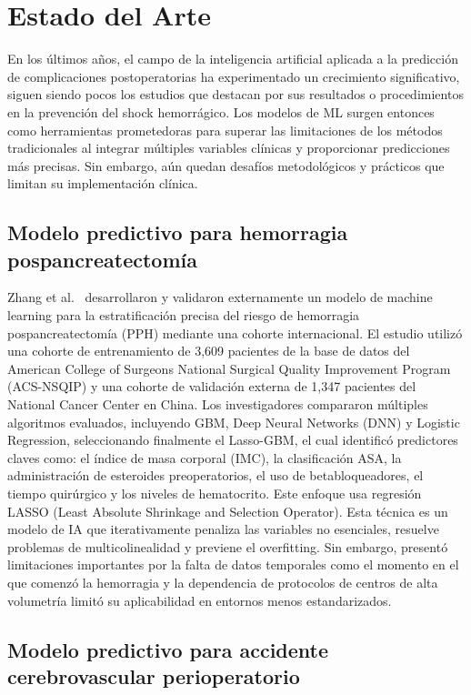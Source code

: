 \section{Estado del Arte}

En los últimos años, el campo de la inteligencia artificial aplicada a la predicción de complicaciones postoperatorias ha experimentado un crecimiento significativo, siguen siendo pocos los estudios que destacan por sus resultados o procedimientos en la prevención del shock hemorrágico. Los modelos de ML surgen entonces como herramientas prometedoras para superar las limitaciones de los métodos tradicionales al integrar múltiples variables clínicas y proporcionar predicciones más precisas. Sin embargo, aún quedan desafíos metodológicos y prácticos que limitan su implementación clínica.

\subsection{Modelo predictivo para hemorragia pospancreatectomía}

Zhang et al.\ \cite{zhang2025} desarrollaron y validaron externamente un modelo de machine learning para la estratificación precisa del riesgo de hemorragia pospancreatectomía (PPH) mediante una cohorte internacional. El estudio utilizó una cohorte de entrenamiento de 3,609 pacientes de la base de datos del American College of Surgeons National Surgical Quality Improvement Program (ACS-NSQIP) y una cohorte de validación externa de 1,347 pacientes del National Cancer Center en China. Los investigadores compararon múltiples algoritmos evaluados, incluyendo GBM, Deep Neural Networks (DNN) y Logistic Regression, seleccionando finalmente el Lasso-GBM, el cual identificó predictores claves como: el índice de masa corporal (IMC), la clasificación ASA, la administración de esteroides preoperatorios, el uso de betabloqueadores, el tiempo quirúrgico y los niveles de hematocrito. Este enfoque usa regresión LASSO (Least Absolute Shrinkage and Selection Operator). Esta técnica es un modelo de IA que iterativamente penaliza las variables no esenciales, resuelve problemas de multicolinealidad y previene el overfitting. Sin embargo, presentó limitaciones importantes por la falta de datos temporales como el momento en el que comenzó la hemorragia y la dependencia de protocolos de centros de alta volumetría limitó su aplicabilidad en entornos menos estandarizados.

\subsection{Modelo predictivo para accidente cerebrovascular perioperatorio}

